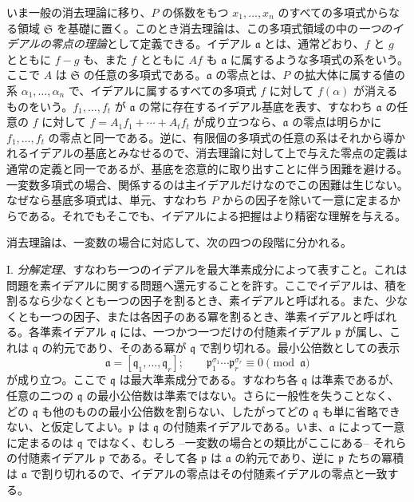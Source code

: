 \documentclass[11pt]{article}
\begin{document}
いま一般の消去理論に移り、$P$ の係数をもつ $x_1,\ldots,x_n$ のすべての多項式からなる領域 $\mathfrak S$ を基礎に置く。このとき消去理論は、この多項式領域の中の\emph{一つのイデアルの零点の理論}として定義できる。イデアル $\mathfrak a$ とは、通常どおり、$f$ と $g$ とともに $f-g$ も、また $f$ とともに $Af$ も $\mathfrak a$ に属するような多項式の系をいう。ここで $A$ は $\mathfrak S$ の任意の多項式である。$\mathfrak a$ の零点とは、$P$ の拡大体に属する値の系 $\alpha_1,\ldots,\alpha_n$ で、イデアルに属するすべての多項式 $f$ に対して $f(\alpha)$ が消えるものをいう。$f_1,\ldots,f_t$ が $\mathfrak a$ の常に存在するイデアル基底を表す、すなわち $\mathfrak a$ の任意の $f$ に対して $f=A_1f_1+\cdots+A_tf_t$ が成り立つなら、$\mathfrak a$ の零点は明らかに $f_1,\ldots,f_t$ の零点と同一である。逆に、有限個の多項式の任意の系はそれから導かれるイデアルの基底とみなせるので、消去理論に対して上で与えた零点の定義は通常の定義と同一であるが、基底を恣意的に取り出すことに伴う困難を避ける。一変数多項式の場合、関係するのは主イデアルだけなのでこの困難は生じない。なぜなら基底多項式は、単元、すなわち $P$ からの因子を除いて一意に定まるからである。それでもそこでも、イデアルによる把握はより精密な理解を与える。

消去理論は、一変数の場合に対応して、次の四つの段階に分かれる。

I. \emph{分解定理}、すなわち一つのイデアルを最大準素成分によって表すこと。これは問題を素イデアルに関する問題へ還元することを許す。ここでイデアルは、積を割るなら少なくとも一つの因子を割るとき、素イデアルと呼ばれる。また、少なくとも一つの因子、または各因子のある冪を割るとき、準素イデアルと呼ばれる。各準素イデアル $\mathfrak q$ には、一つかつ一つだけの付随素イデアル $\mathfrak p$ が属し、これは $\mathfrak q$ の約元であり、そのある冪が $\mathfrak q$ で割り切れる。最小公倍数としての表示
\[
 \mathfrak a=[\mathfrak q_1,\ldots,\mathfrak q_r];\qquad
 \mathfrak p_1^{\sigma_1}\cdots \mathfrak p_r^{\sigma_r}\equiv 0\pmod{\mathfrak a}
\]
が成り立つ。ここで $\mathfrak q$ は最大準素成分である。すなわち各 $\mathfrak q$ は準素であるが、任意の二つの $\mathfrak q$ の最小公倍数は準素ではない。さらに一般性を失うことなく、どの $\mathfrak q$ も他のものの最小公倍数を割らない、したがってどの $\mathfrak q$ も単に省略できない、と仮定してよい。$\mathfrak p$ は $\mathfrak q$ の付随素イデアルである。いま、$\mathfrak a$ によって一意に定まるのは $\mathfrak q$ ではなく、むしろ --一変数の場合との類比がここにある-- それらの付随素イデアル $\mathfrak p$ である。そして各 $\mathfrak p$ は $\mathfrak a$ の約元であり、逆に $\mathfrak p$ たちの冪積は $\mathfrak a$ で割り切れるので、イデアルの零点はその付随素イデアルの零点と一致する。
\end{document}

